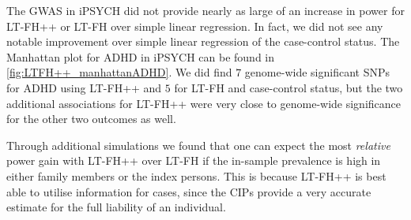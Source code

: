The GWAS in iPSYCH did not provide nearly as large of an increase in power for LT-FH++ or LT-FH over simple linear regression. In fact, we did not see any notable improvement over simple linear regression of the case-control status. The Manhattan plot for ADHD in iPSYCH can be found in \cref{fig:LTFH++_manhattanADHD}. We did find $ 7 $ genome-wide significant SNPs for ADHD using LT-FH++ and $ 5 $ for LT-FH and case-control status, but the two additional associations for LT-FH++ were very close to genome-wide significance for the other two outcomes as well.

Through additional simulations we found that one can expect the most \textit{relative} power gain with LT-FH++ over LT-FH if the in-sample prevalence is high in either family members or the index persons. This is because LT-FH++ is best able to utilise information for cases, since the CIPs provide a very accurate estimate for the full liability of an individual.